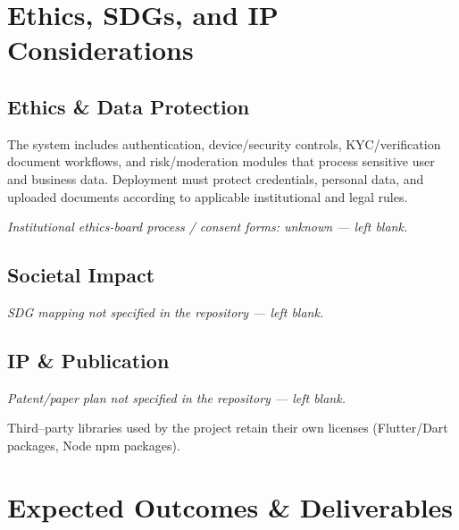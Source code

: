 \documentclass[11pt,a4paper]{article}
\begin{document}
\section{Ethics, SDGs, and IP Considerations}

\subsection{Ethics \& Data Protection}

The system includes authentication, device/security controls, KYC/verification
document workflows, and risk/moderation modules that process sensitive user and
business data. Deployment must protect credentials, personal data, and uploaded
documents according to applicable institutional and legal rules.

\textit{Institutional ethics-board process / consent forms: unknown --- left blank.}

\subsection{Societal Impact}

\textit{SDG mapping not specified in the repository --- left blank.}

\subsection{IP \& Publication}

\textit{Patent/paper plan not specified in the repository --- left blank.}

Third--party libraries used by the project retain their own licenses
(Flutter/Dart packages, Node npm packages).

\section{Expected Outcomes \& Deliverables}
\end{document}
